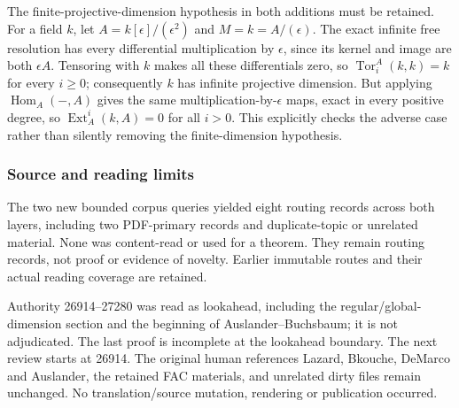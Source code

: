 The finite-projective-dimension hypothesis in both additions must be retained. For a field \(k\), let \(A=k[\epsilon]/(\epsilon^2)\) and \(M=k=A/(\epsilon)\). The exact infinite free resolution has every differential multiplication by \(\epsilon\), since its kernel and image are both \(\epsilon A\). Tensoring with \(k\) makes all these differentials zero, so \(\operatorname{Tor}^A_i(k,k)=k\) for every \(i\ge0\); consequently \(k\) has infinite projective dimension. But applying \(\operatorname{Hom}_A(-,A)\) gives the same multiplication-by-\(\epsilon\) maps, exact in every positive degree, so \(\operatorname{Ext}_A^i(k,A)=0\) for all \(i>0\). This explicitly checks the adverse case rather than silently removing the finite-dimension hypothesis.

\subsubsection{Source and reading limits}\label{algebra-proof-022-source-and-reading-limits}

The two new bounded corpus queries yielded eight routing records across both layers, including two PDF-primary records and duplicate-topic or unrelated material. None was content-read or used for a theorem. They remain routing records, not proof or evidence of novelty. Earlier immutable routes and their actual reading coverage are retained.

Authority 26914--27280 was read as lookahead, including the regular/global-dimension section and the beginning of Auslander--Buchsbaum; it is not adjudicated. The last proof is incomplete at the lookahead boundary. The next review starts at 26914. The original human references Lazard, Bkouche, DeMarco and Auslander, the retained FAC materials, and unrelated dirty files remain unchanged. No translation/source mutation, rendering or publication occurred.

